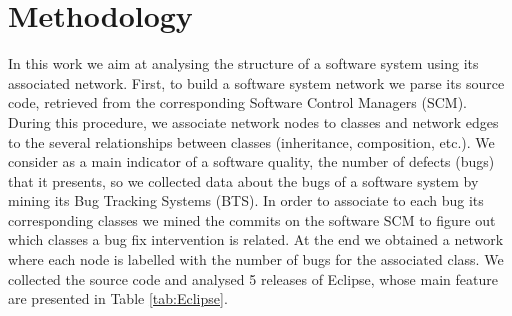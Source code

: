 \section{Methodology}
\label{Methodology}
In this work we aim at analysing the structure of a software system using its associated network.
First, to build a software system network we parse its source code, retrieved 
from the corresponding Software Control Managers (SCM). 
During this procedure, we associate network nodes to classes and network edges to the several relationships 
between classes (inheritance, composition, etc.). 
We consider as a main indicator of a software quality, the number of defects (bugs) that it presents, so  
we collected data about the bugs of a software system by mining its Bug Tracking Systems (BTS). 
In order to associate to each bug its corresponding classes we mined the commits on the software SCM to figure out
which classes a bug fix intervention is related. %
At the end we obtained a network where each node is labelled %
with the number of bugs for the associated class. 
We collected the source code and analysed 5 releases of Eclipse, whose main feature are 
presented in Table \ref{tab:Eclipse}. 


